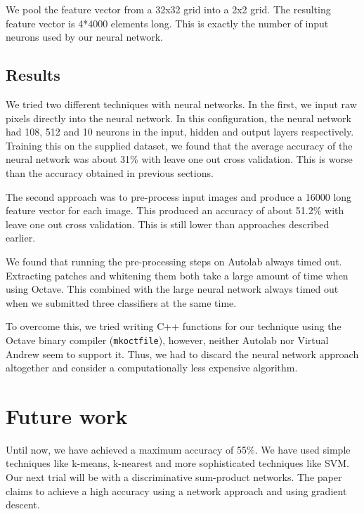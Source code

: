 \documentclass{article} %
\begin{document}
        We pool the feature vector from a 32x32 grid into a 2x2 grid. The resulting feature vector is 4*4000 elements long. This is exactly the number of input neurons used by our neural network.


    \subsection{Results} %
    \label{sub:Results}
        We tried two different techniques with neural networks. In the first, we input raw pixels directly into the neural network. In this configuration, the neural network had 108, 512 and 10 neurons in the input, hidden and output layers respectively. Training this on the supplied dataset, we found that the average accuracy of the neural network was about 31\% with leave one out cross validation. This is worse than the accuracy obtained in previous sections.

        The second approach was to pre-process input images and produce a 16000 long feature vector for each image. This produced an accuracy of about 51.2\% with leave one out cross validation. This is still lower than approaches described earlier.

        We found that running the pre-processing steps on Autolab always timed out. Extracting patches and whitening them both take a large amount of time when using Octave. This combined with the large neural network always timed out when we submitted three classifiers at the same time.

        To overcome this, we tried writing C++ functions for our technique using the Octave binary compiler (\texttt{mkoctfile}), however, neither Autolab nor Virtual Andrew seem to support it. Thus, we had to discard the neural network approach altogether and consider a computationally less expensive algorithm.


\section{Future work}
    Until now, we have achieved a maximum accuracy of 55\%. We have used simple techniques like k-means, k-nearest and more sophisticated techniques like SVM. Our next trial will be with a discriminative sum-product networks. The paper claims to achieve a high accuracy using a network approach and using gradient descent.
\end{document}

